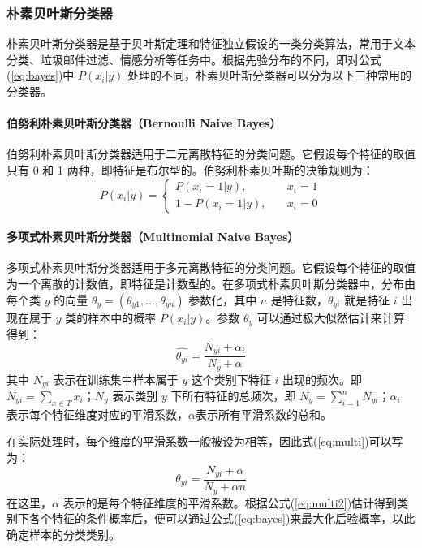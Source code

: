 \documentclass[a4paper,12pt,onecolumn,oneside]{article}
\begin{document}
\subsubsection{朴素贝叶斯分类器}
	朴素贝叶斯分类器是基于贝叶斯定理和特征独立假设的一类分类算法，常用于文本分类、垃圾邮件过滤、情感分析等任务中。根据先验分布的不同，即对公式(\ref{eq:bayes})中 $P(x_i|y)$ 处理的不同，朴素贝叶斯分类器可以分为以下三种常用的分类器。
	\paragraph{伯努利朴素贝叶斯分类器（Bernoulli Naive Bayes）}
	伯努利朴素贝叶斯分类器适用于二元离散特征的分类问题。它假设每个特征的取值只有 0 和 1 两种，即特征是布尔型的。伯努利朴素贝叶斯的决策规则为：
	\begin{equation*}
		P(x_i|y) = \left\{ 
		\begin{array}{ll}
				P(x_i=1|y), &\quad x_i = 1 \\
				1 - P(x_i=1|y), &\quad x_i = 0 
		\end{array} \right.
	\end{equation*}
	\paragraph{多项式朴素贝叶斯分类器（Multinomial Naive Bayes）}
	多项式朴素贝叶斯分类器适用于多元离散特征的分类问题。它假设每个特征的取值为一个离散的计数值，即特征是计数型的。在多项式朴素贝叶斯分类器中，分布由每个类 $y$ 的向量 $\theta_y = (\theta_{y1}, ..., \theta_{yn})$ 参数化，其中 $n$ 是特征数，$\theta_{yi}$ 就是特征 $i$ 出现在属于 $y$ 类的样本中的概率 $P(x_i|y)$。参数 $\theta_y$ 可以通过极大似然估计来计算得到：
	\begin{equation}\label{eq:multi}
		\hat{\theta_{yi}} = \frac{N_{yi}+\alpha_i}{N_{y}+\alpha}
	\end{equation}
	其中 $N_{yi}$ 表示在训练集中样本属于 $y$ 这个类别下特征 $i$ 出现的频次。即 $N_{yi} = \sum_{x\in T} x_i$；$N_y$ 表示类别 $y$ 下所有特征的总频次，即 $N_y = \sum_{i=1}^{n} N_{yi}$；$\alpha_i$ 表示每个特征维度对应的平滑系数，$\alpha$表示所有平滑系数的总和。\par 
	在实际处理时，每个维度的平滑系数一般被设为相等，因此式(\ref{eq:multi})可以写为：
	\begin{equation}\label{eq:multi2}
		\hat{\theta_{yi}} = \frac{N_{yi}+\alpha}{N_{y}+\alpha n}
	\end{equation}
	在这里，$\alpha$ 表示的是每个特征维度的平滑系数。根据公式(\ref{eq:multi2})估计得到类别下各个特征的条件概率后，便可以通过公式(\ref{eq:bayes})来最大化后验概率，以此确定样本的分类类别。
\end{document}
